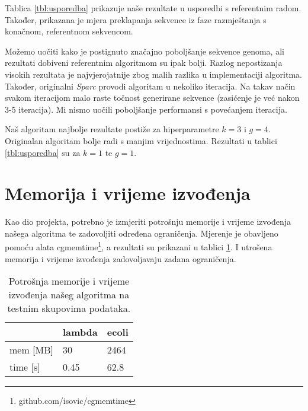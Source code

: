 Tablica \ref{tbl:usporedba} prikazuje naše rezultate u usporedbi s referentnim radom. Također, prikazana je mjera preklapanja sekvence iz faze razmještanja s konačnom, referentnom sekvencom.

Možemo uočiti kako je postignuto značajno poboljšanje sekvence genoma, ali rezultati dobiveni referentnim algoritmom su ipak bolji.
Razlog nepostizanja visokih rezultata je najvjerojatnije zbog malih razlika u implementaciji algoritma.
Također, originalni \emph{Sparc} provodi algoritam u nekoliko iteracija.
Na takav način svakom iteracijom malo raste točnost generirane sekvence (zasićenje je već nakon 3-5 iteracija).
Mi nismo uočili poboljšanje performansi s povećanjem iteracija.

Naš algoritam najbolje rezultate postiže za hiperparametre $k = 3$ i $g = 4$.
Originalan algoritam bolje radi s manjim vrijednostima.
Rezultati u tablici \ref{tbl:usporedba} su za $k = 1$ te $g = 1$.

\section{Memorija i vrijeme izvođenja}

Kao dio projekta, potrebno je izmjeriti potrošnju memorije i vrijeme izvođenja našega algoritma te zadovoljiti određena ograničenja.
Mjerenje je obavljeno pomoću alata cgmemtime\footnote{github.com/isovic/cgmemtime}, a rezultati su prikazani u tablici \ref{tbl:mem}.
I utrošena memorija i vrijeme izvođenja zadovoljavaju zadana ograničenja.

\begin{table}[]
\centering
\caption{Potrošnja memorije i vrijeme izvođenja našeg algoritma na testnim skupovima podataka.}
\label{tbl:mem}
\begin{tabular}{l|ll}
  & lambda & ecoli \\ \hline
  mem {[}MB{]} & 30     & 2464  \\
  time {[}s{]} & 0.45   & 62.8 
\end{tabular}
\end{table}

